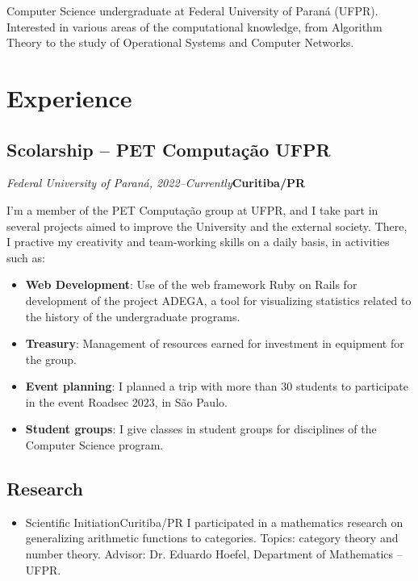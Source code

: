 \documentclass[a4paper, 12pt]{moderncv}
\begin{document}
\makecvtitle

\small{Computer Science undergraduate at Federal University of Paraná (UFPR).
Interested in various areas of the computational knowledge, from Algorithm
Theory to the study of Operational Systems and Computer Networks.}

\section{Experience}
\vspace{1pt}
\subsection{\small{Scolarship -- PET Computação UFPR}}
\textit{Federal University of Paraná, 2022--Currently}\hspace{190pt}\textbf{Curitiba/PR}

\vspace{3pt}
I'm a member of the PET Computação group at UFPR, and I take part in several
projects aimed to improve the University and the external society. There, I
practive my creativity and team-working skills on a daily basis, in activities
such as:
\vspace{4pt}
\begin{itemize}
    \item{\textbf{Web Development}: Use of the web framework Ruby on Rails for
          development of the project ADEGA, a tool for visualizing statistics
          related to the history of the undergraduate programs.}
    \item{\textbf{Treasury}: Management of resources earned for investment in
          equipment for the group.}
    \item{\textbf{Event planning}: I planned a trip with more than 30 students
          to participate in the event Roadsec 2023, in São Paulo.}
    \item{\textbf{Student groups}: I give classes in student groups for
          disciplines of the Computer Science program.}
\end{itemize}

\vspace{4pt}
\subsection{\small{Research}}
\begin{itemize}
    \item{
        {Scientific Initiation}{Curitiba/PR}{}
        {I participated in a mathematics research on generalizing arithmetic functions
        to categories. Topics: category theory and number theory. Advisor: Dr. Eduardo
        Hoefel, Department of Mathematics -- UFPR.}}
\end{itemize}
\end{document}
